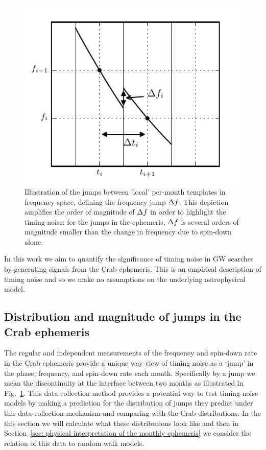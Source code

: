 \documentclass[../full_thesis/full_thesis.tex]{subfiles}
\begin{document}
\begin{figure}[htb]
\centering
    \includegraphics{template_jumps}
\caption{Illustration of the jumps between 'local' per-month templates in
    frequency space, defining the frequency jump $\Delta f$. This
        depiction amplifies the order of magnitude of $\Delta f$ in order to
        highlight the timing-noise: for the jumps in the ephemeris, $\Delta f$
        is several orders of magnitude smaller than the change in frequency
        due to spin-down alone.}
\label{fig: template jumps}
\end{figure}

In this work we aim to quantify the significance of timing
noise in GW searches by generating signals from the Crab ephemeris. This
is an empirical description of timing noise and so we
make no assumptions on the underlying astrophysical model.

\subsection{Distribution and magnitude of jumps in the Crab ephemeris}
\label{sec: jumps}

The regular and independent measurements of the frequency and spin-down rate in
the Crab ephemeris provide a unique way view of timing noise as a `jump' in the
phase, frequency, and spin-down rate each month. Specifically by a jump we mean
the discontinuity at the interface between two months as illustrated in
Fig.~\ref{fig: template jumps}.  This data collection method provides a
potential way to test timing-noise models by making a prediction for the
distribution of jumps they predict under this data collection mechanism and
comparing with the Crab distributions. In the this section we will
calculate what these distributions look like and then in Section~\ref{sec:
physical interpretation of the monthly ephemeris} we consider the relation of
this data to random walk models.
\end{document}
